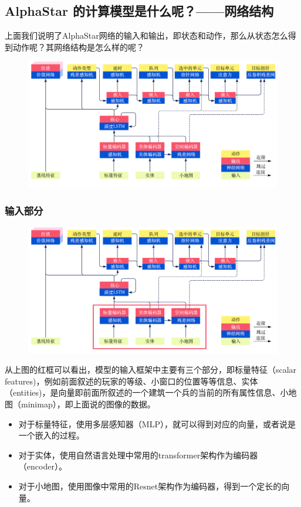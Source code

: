 \subsection{AlphaStar 的计算模型是什么呢？——网络结构} 

上面我们说明了AlphaStar网络的输入和输出，即状态和动作，那么从状态怎么得到动作呢？其网络结构是怎么样的呢？

\begin{figure}[htpb]
    \centering
    \includegraphics[width=0.7\linewidth]{res/ch13/13.3}
    \caption{}
    \label{fig:}
\end{figure}

\subsubsection{输入部分} 

\begin{figure}[htpb]
    \centering
    \includegraphics[width=0.7\linewidth]{res/ch13/13.4}
    \caption{}
    \label{fig:}
\end{figure}

从上图的红框可以看出，模型的输入框架中主要有三个部分，即标量特征（scalar features)，例如前面叙述的玩家的等级、小窗口的位置等等信息、实体（entities)，是向量即前面所叙述的一个建筑一个兵的当前的所有属性信息、小地图（minimap），即上面说的图像的数据。

\begin{itemize}
    \item 对于标量特征，使用多层感知器（MLP），就可以得到对应的向量，或者说是一个嵌入的过程。
    \item 对于实体，使用自然语言处理中常用的transformer架构作为编码器（encoder）。
    \item 对于小地图，使用图像中常用的Resnet架构作为编码器，得到一个定长的向量。
\end{itemize}

